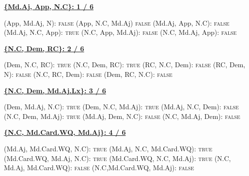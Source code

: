 \documentclass[output=paper,colorlinks,citecolor=brown,draft]{langscibook}
\begin{document}
\begin{exe}
  \ex \label{cbf}
     \begin{xlist}
        \ex \textbf{\uline{ \{Md.Aj, App, N.C\}: \hfill 1 / 6 } }
          \begin{xlist}
              \ex  (App, Md.Aj, N): \hfill \textsc{false}
              \ex  (App, N.C, Md.Aj)  \hfill \textsc{false}
              \ex (Md.Aj, App, N.C):  \hfill \textsc{false}
              \ex (Md.Aj, N.C, App): \hfill \textsc{true}
             \ex (N.C, App, Md.Aj):   \hfill \textsc{false}
             \ex  (N.C, Md.Aj, App):  \hfill \textsc{false} \\ 
          \end{xlist}

        \ex \label{cbfb} \textbf{\uline{ \{N.C, Dem, RC\}: \hfill 2 / 6   } }
          \begin{xlist}
              \ex (Dem, N.C, RC):   \hfill \textsc{true}
              \ex (N.C, Dem, RC):   \hfill \textsc{true}
              \ex (RC, N.C, Dem):   \hfill \textsc{false}
              \ex (RC, Dem,  N):  \hfill  \textsc{false}
              \ex (N.C, RC, Dem):   \hfill \textsc{false}
              \ex (Dem, RC, N.C):   \hfill \textsc{false}  \\ 
          \end{xlist}

        \ex \textbf{\uline{ \{N.C, Dem, Md.Aj.Lx\}: \hfill 3 / 6}}
          \begin{xlist}
              \ex (Dem, Md.Aj, N.C): \hfill \textsc{true}
              \ex (Dem, N.C, Md.Aj): \hfill \textsc{true}
              \ex (Md.Aj, N.C, Dem): \hfill \textsc{false}
              \ex (N.C, Dem, Md.Aj): \hfill \textsc{true}
              \ex (Md.Aj, Dem,  N.C): \hfill \textsc{false}
              \ex (N.C, Md.Aj, Dem): \hfill \textsc{false} \\ 
          \end{xlist}

        \ex \textbf{\uline{ \{N.C, Md.Card.WQ, Md.Aj\}: \hfill 4 / 6 } }
          \begin{xlist}
              \ex (Md.Aj, Md.Card.WQ, N.C): \hfill \textsc{true}
              \ex (Md.Aj, N.C, Md.Card.WQ): \hfill \textsc{true}
              \ex (Md.Card.WQ, Md.Aj, N.C): \hfill \textsc{true}
              \ex (Md.Card.WQ, N.C, Md.Aj): \hfill  \textsc{true}
              \ex (N.C, Md.Aj, Md.Card.WQ): \hfill  \textsc{false}
              \ex (N.C,Md.Card.WQ, Md.Aj):  \hfill \textsc{false}  \\ 
          \end{xlist}


\end{xlist}
\end{exe}
\end{document}
